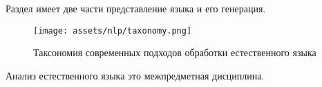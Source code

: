 Раздел имеет две части представление языка и его генерация.

\begin{figure}[h]
    \centering
    \texttt{[image: assets/nlp/taxonomy.png]}
    \caption{Таксономия современных подходов обработки естественного языка}
    \label{llm_taxonomy}
\end{figure}

Анализ естественного языка это межпредметная дисциплина.